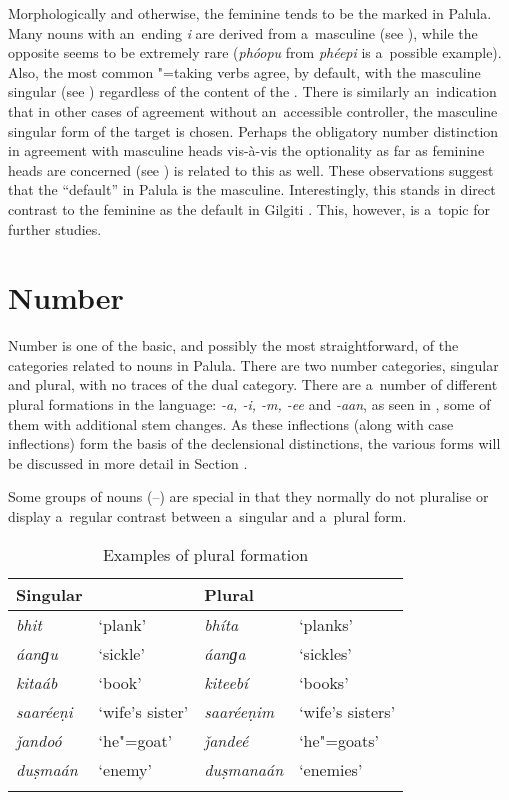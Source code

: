 Morphologically and otherwise, the feminine tends to be the marked  in Palula. Many nouns with an~ending \textit{i} are derived from a~masculine  (see ), while the opposite seems to be extremely rare (\textit{phóopu} from \textit{phéepi} is a~possible example). Also, the most common "=taking verbs agree, by default, with the masculine singular (see ) regardless of the content of the . There is similarly an~indication that in other cases of agreement without an~accessible controller, the masculine singular form of the target is chosen. Perhaps the obligatory number distinction in agreement with masculine heads vis-à-vis the optionality as far as feminine heads are concerned (see ) is related to this as well. These observations suggest that the ``default'' in Palula is the masculine. Interestingly, this stands in direct contrast to the feminine as the default  in Gilgiti  \citep[176]{hookzia2005}. This, however, is a~topic for further studies.

\section{Number}
\label{sec:4-4}

Number is one of the basic, and possibly the most straightforward, of the  categories related to nouns in Palula. There are two number categories, singular and plural, with no traces of the  dual category. There are a~number of different plural formations in the language: \textit{-a, -i, -m, -ee} and \textit{-aan}, as seen in , some of them with additional stem changes. As these inflections (along with  case inflections) form the basis of the declensional distinctions, the various forms will be discussed in more detail in Section . 

Some groups of nouns (--) are special in that they normally do not pluralise or display a~regular contrast between a~singular and a~plural form.



\begin{table}[ht]
\caption{Examples of plural formation}
\begin{tabularx}{\textwidth}{ Q Q Q Q }
\lsptoprule
Singular &
&
Plural &
\\\hline
\textit{bhit} &
`plank' &
\textit{bhíta} &
`planks'\\
\textit{áanɡu} &
`sickle' &
\textit{áanɡa} &
`sickles'\\
\textit{kitaáb} &
`book' &
\textit{kiteebí} &
`books'\\
\textit{saaréeṇi} &
`wife's sister' &
\textit{saaréeṇim} &
`wife's sisters'\\
\textit{ǰandoó} &
`he"=goat' &
\textit{ǰandeé} &
`he"=goats'\\
\textit{duṣmaán} &
`enemy' &
\textit{duṣmanaán} &
`enemies'\\\lspbottomrule
\end{tabularx}
\label{tab:4-5}
\end{table}

